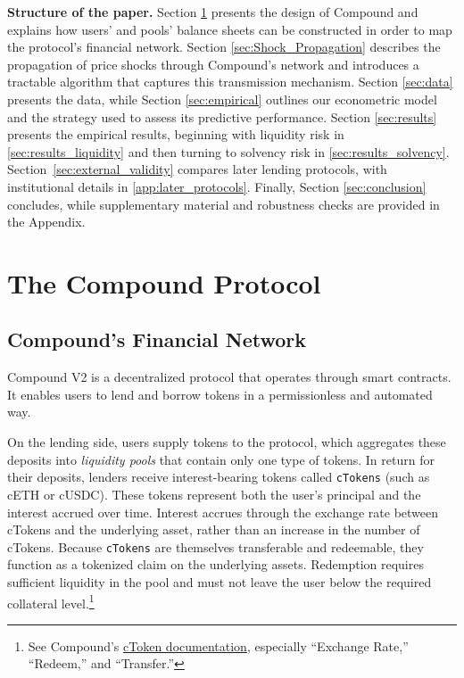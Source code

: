 \documentclass[a4paper,UKenglish,cleveref, autoref, thm-restate]{informs3}
\DeclareRobustCommand{\latestrev}[1]{{\color{red}\hypersetup{linkcolor=red,citecolor=red,urlcolor=red}#1}}
\begin{document}
\medskip

\textbf{Structure of the paper.} Section \ref{sec:Compound_Design} presents the design of Compound and explains how users' and pools' balance sheets can be constructed in order to map the protocol’s financial network. Section \ref{sec:Shock_Propagation} describes the propagation of price shocks through Compound’s network and introduces a tractable algorithm that captures this transmission mechanism. Section \ref{sec:data} presents the data, while Section \ref{sec:empirical} outlines our econometric model and the strategy used to assess its predictive performance. Section \ref{sec:results} presents the empirical results, beginning with liquidity risk in \autoref{sec:results_liquidity} and then turning to solvency risk in \autoref{sec:results_solvency}. \latestrev{Section~\ref{sec:external_validity} compares later lending protocols, with institutional details in \ref{app:later_protocols}.} Finally, Section \ref{sec:conclusion} concludes, while supplementary material and robustness checks are provided in the Appendix.

\section{The Compound Protocol}
\label{sec:Compound_Design}

\medskip

\subsection{Compound's Financial Network}
\label{sec:financial_network}

Compound V2 is a decentralized protocol that operates through smart contracts. It enables users to lend and borrow tokens in a permissionless and automated way.

On the lending side, users supply tokens to the protocol, which aggregates these deposits into \textit{liquidity pools} that contain only one type of tokens. In return for their deposits, lenders receive interest-bearing tokens called \texttt{cTokens} (such as cETH or cUSDC). These tokens represent both the user’s principal and the interest accrued over time. \latestrev{Interest accrues through the exchange rate between cTokens and the underlying asset, rather than an increase in the number of cTokens.} Because \texttt{cTokens} are themselves transferable and redeemable, they function as a tokenized claim on the underlying assets. \latestrev{Redemption requires sufficient liquidity in the pool and must not leave the user below the required collateral level.}\footnote{\latestrev{See Compound's \href{https://docs.compound.finance/v2/ctokens/}{cToken documentation}, especially ``Exchange Rate,'' ``Redeem,'' and ``Transfer.''}}
\end{document}
